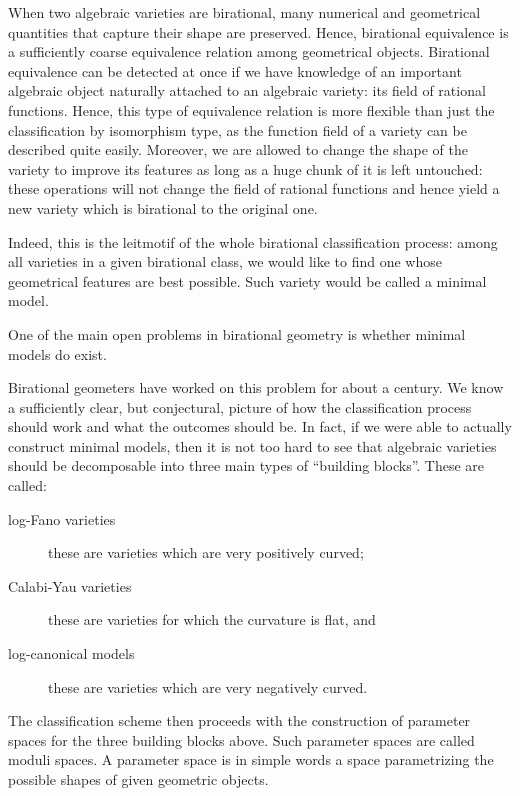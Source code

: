 \documentclass[10.9pt]{res} %
\numberwithin{equation}{section}
\theoremstyle{definition}
\begin{document}
\begin{resume}
When two algebraic varieties are birational, many numerical and geometrical quantities that capture their
shape are preserved. Hence, birational equivalence is a sufficiently coarse equivalence 
relation among geometrical objects. Birational equivalence can be detected at once if we have knowledge of an important algebraic 
object naturally attached to an algebraic variety: its field of rational functions.
Hence, this type of equivalence relation
is more flexible than just the classification by isomorphism type, as the function field of a variety
can be described quite easily. Moreover, we are allowed to change the shape of the variety to improve its features
as long as a huge chunk of it is left untouched: these operations will not change the field of rational functions 
and hence yield a new variety which is birational to the original one. 

Indeed, this is the leitmotif of the whole birational
classification process: among all varieties in a given birational class, we would like to find
one whose geometrical features are best possible. Such variety would be called a minimal model.

One of the main open problems in birational geometry is whether minimal models do exist.

Birational geometers have worked on this problem for about a century.
We know a sufficiently clear, but conjectural, picture of how the classification process
should work and what the outcomes should be.\newline
In fact, if we were able to actually construct minimal models, then it is not too hard to see that algebraic
varieties should be decomposable into three main types of ``building blocks''.
These are called:
\begin{description}
\item[log-Fano varieties] these are varieties which are very positively curved;
\item[Calabi-Yau varieties] these are varieties for which the curvature is flat, and
\item[log-canonical models] these are varieties which are very negatively curved.
\end{description}  
The classification scheme then proceeds with the construction of parameter spaces for 
the three building blocks above. Such parameter spaces are called moduli spaces.
A parameter space is in simple words a space parametrizing the possible shapes of given geometric objects.


\end{resume}
\end{document}
